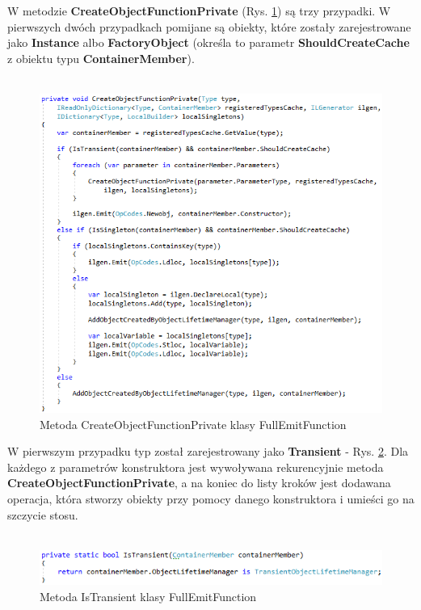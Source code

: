 \documentclass[12pt]{article}
\begin{document}
W metodzie \textbf{CreateObjectFunctionPrivate} (Rys. \ref{fig:FullEmitFunction_CreateObjectFunctionPrivate}) są trzy przypadki. W pierwszych dwóch przypadkach pomijane są obiekty, które zostały zarejestrowane jako \textbf{Instance} albo \textbf{FactoryObject} (określa to parametr \textbf{ShouldCreateCache} z obiektu typu \textbf{ContainerMember}).\\ \\
\begin{figure}[H]
	\begin{center}
  		\includegraphics{FullEmitFunction_CreateObjectFunctionPrivate.png}
  		\caption{Metoda CreateObjectFunctionPrivate klasy FullEmitFunction}
  		\label{fig:FullEmitFunction_CreateObjectFunctionPrivate}
	\end{center}
\end{figure}

W pierwszym przypadku typ został zarejestrowany jako \textbf{Transient} - Rys. \ref{fig:FullEmitFunction_IsTransient}. Dla każdego z parametrów konstruktora jest wywoływana rekurencyjnie metoda \textbf{CreateObjectFunctionPrivate}, a na koniec do listy kroków jest dodawana operacja, która stworzy obiekty przy pomocy danego konstruktora i umieści go na szczycie stosu.\\ \\
\begin{figure}[H]
	\begin{center}
  		\includegraphics{FullEmitFunction_IsTransient.png}
  		\caption{Metoda IsTransient klasy FullEmitFunction}
  		\label{fig:FullEmitFunction_IsTransient}
	\end{center}
\end{figure}
\end{document}
